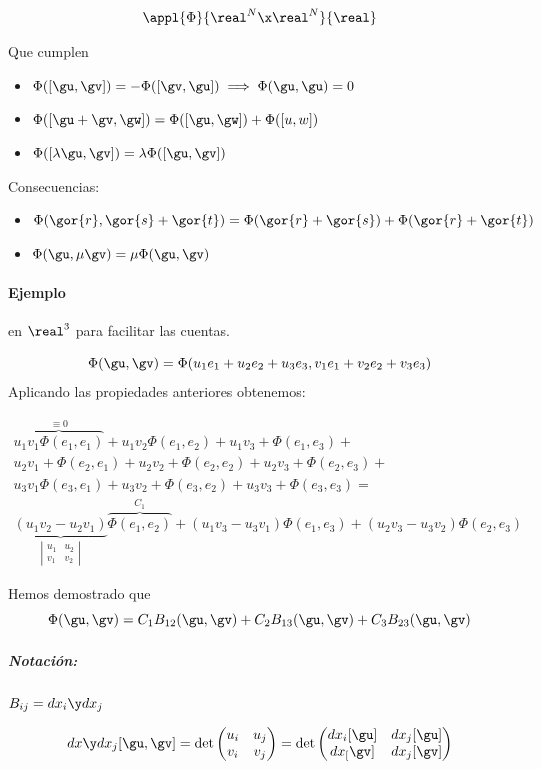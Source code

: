 \[\appl{\Phi}{\real^N\x\real^N}{\real}\]

Que cumplen \begin{itemize}
\item $\Phi([\gu,\gv]) = - \Phi([\gv,\gu]) \implies \Phi(\gu,\gu)=0$
\item $ \Phi([\gu+\gv,\gw]) = \Phi ([\gu,\gw]) + \Phi([u,w])$
\item$\Phi([\lambda \gu,\gv]) = \lambda \Phi([\gu,\gv])$
\end{itemize}

Consecuencias:

\begin{itemize}
\item $\Phi(\gor{r}, \gor{s}+\gor{t}) = \Phi(\gor{r}+\gor{s}) + \Phi(\gor{r}+\gor{t})$
\item $\Phi(\gu,\mu\gv) = \mu\Phi(\gu,\gv)$
\end{itemize}


\paragraph{Ejemplo} en $\real^3$ para facilitar las cuentas.

\[\Phi(\gu,\gv) = \Phi(u_1e_1+u_2e_2+u_3e_3,v_1e_1+v_2e_2+v_3e_3)\]
Aplicando las propiedades anteriores obtenemos:

\begin{gather*}
\overbrace{u_1v_1\Phi(e_1,e_1)}^{\equiv 0} + u_1v_2\Phi(e_1,e_2) + u_1v_3+\Phi(e_1,e_3)+\\
u_2v_1+\Phi(e_2,e_1)+u_2v_2+\Phi(e_2,e_2)+u_2v_3+\Phi(e_2,e_3)+\\
u_3v_1\Phi(e_3,e_1)+u_3v_2+\Phi(e_3,e_2)+u_3v_3+\Phi(e_3,e_3) = \\
\underbrace{(u_1v_2-u_2v_1)}_{\left|\begin{matrix}
u_1&u_2\\v_1&v_2
\end{matrix}\right|}\overbrace{\Phi(e_1,e_2)}^{C_1}+(u_1v_3-u_3v_1)\Phi(e_1,e_3)+(u_2v_3-u_3v_2)\Phi(e_2,e_3)
\end{gather*}

Hemos demostrado que \[\Phi(\gu,\gv) = C_1B_{12}(\gu,\gv) + C_2B_{13}(\gu,\gv) + C_3B_{23}(\gu,\gv)\]

\subparagraph{Notación:} $B_{ij} = dx_i\y dx_j$

\[dx\y dx_j [\gu,\gv] = \det \begin{pmatrix}
u_i&u_j\\v_i&v_j
\end{pmatrix} = \det \begin{pmatrix}
dx_i[\gu]&dx_j[\gu]\\dx_[\gv]&dx_j[\gv]
\end{pmatrix}\]

